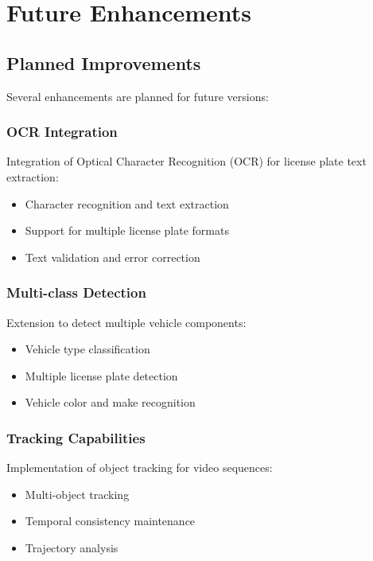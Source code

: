 \documentclass[12pt,a4paper]{article}
\begin{document}
\section{Future Enhancements}

\subsection{Planned Improvements}

Several enhancements are planned for future versions:

\subsubsection{OCR Integration}

Integration of Optical Character Recognition (OCR) for license plate text extraction:

\begin{itemize}
    \item Character recognition and text extraction
    \item Support for multiple license plate formats
    \item Text validation and error correction
\end{itemize}

\subsubsection{Multi-class Detection}

Extension to detect multiple vehicle components:

\begin{itemize}
    \item Vehicle type classification
    \item Multiple license plate detection
    \item Vehicle color and make recognition
\end{itemize}

\subsubsection{Tracking Capabilities}

Implementation of object tracking for video sequences:

\begin{itemize}
    \item Multi-object tracking
    \item Temporal consistency maintenance
    \item Trajectory analysis
\end{itemize}
\end{document}
